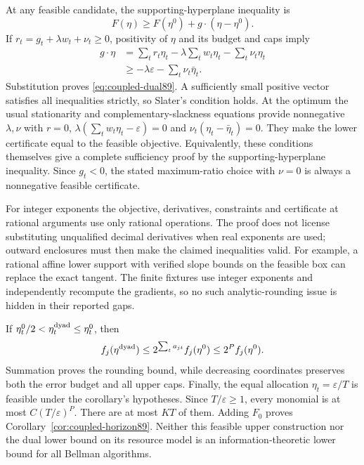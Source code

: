 At any feasible candidate, the supporting-hyperplane inequality is
\[
 F(\eta)\ge F(\eta^0)+g\cdot(\eta-\eta^0).
\]
If $r_t=g_t+\lambda w_t+\nu_t\ge0$, positivity of $\eta$ and its budget and caps imply
\begin{align*}
 g\cdot\eta
 &=\sum_tr_t\eta_t-\lambda\sum_tw_t\eta_t-\sum_t\nu_t\eta_t\\
 &\ge-\lambda\varepsilon-\sum_t\nu_t\bar\eta_t.
\end{align*}
Substitution proves \eqref{eq:coupled-dual89}. A sufficiently small positive vector satisfies all inequalities strictly, so Slater's condition holds. At the optimum the usual stationarity and complementary-slackness equations provide nonnegative $\lambda,\nu$ with $r=0$, $\lambda(\sum_tw_t\eta_t-\varepsilon)=0$ and $\nu_t(\eta_t-\bar\eta_t)=0$. They make the lower certificate equal to the feasible objective. Equivalently, these conditions themselves give a complete sufficiency proof by the supporting-hyperplane inequality. Since $g_t<0$, the stated maximum-ratio choice with $\nu=0$ is always a nonnegative feasible certificate.

For integer exponents the objective, derivatives, constraints and certificate at rational arguments use only rational operations. The proof does not license substituting unqualified decimal derivatives when real exponents are used; outward enclosures must then make the claimed inequalities valid. For example, a rational affine lower support with verified slope bounds on the feasible box can replace the exact tangent. The finite fixtures use integer exponents and independently recompute the gradients, so no such analytic-rounding issue is hidden in their reported gaps.

If $\eta_t^0/2<\eta_t^{\rm dyad}\le\eta_t^0$, then
\[
 f_j(\eta^{\rm dyad})
 \le2^{\sum_ta_{jt}}f_j(\eta^0)\le2^P f_j(\eta^0).
\]
Summation proves the rounding bound, while decreasing coordinates preserves both the error budget and all upper caps. Finally, the equal allocation $\eta_t=\varepsilon/T$ is feasible under the corollary's hypotheses. Since $T/\varepsilon\ge1$, every monomial is at most $C(T/\varepsilon)^P$. There are at most $KT$ of them. Adding $F_0$ proves Corollary~\ref{cor:coupled-horizon89}. Neither this feasible upper construction nor the dual lower bound on its resource model is an information-theoretic lower bound for all Bellman algorithms.
